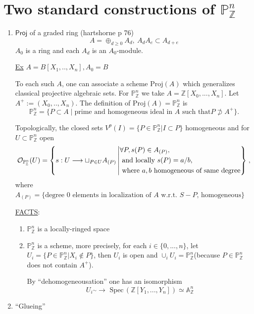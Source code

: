 \documentclass[11pt]{article}
\newcommand{\spec}{\text{ Spec}\,}
\newcommand{\affn}{\mathbb A}
\newcommand{\proj}{\mathbb P}
\newcommand{\intg}{\mathbb Z}
\newcommand{\calo}{{\cal O}}
\newcommand{\notsupset}{\not \supset}
\newcommand{\lrta}{\longrightarrow}
\begin{document}
\section*{Two standard constructions of $\proj^n_\intg$}
\begin{enumerate}[label=(\arabic*)]
\item $\mathsf{Proj}$ of a graded ring (hartshorne p 76)
$$
A=\oplus_{d\geq 0} A_d, ~A_d A_e\subset A_{d+e}
$$
$A_0$ is a ring and each $A_d$ is an $A_0$-module.

\underline{Ex} $A=B[X_1,..,X_n],A_0=B$

To each such $A$, one can associate a scheme $\text{Proj}(A)$ which generalizes classical projective algebraic sets. For $\proj^n_\intg$ we take $A=\intg[X_0,...,X_n]$. Let $A^+:=(X_0,..,X_n)$. The definition of $\text{Proj}(A)=\proj^n_\intg$ is 
$$
\proj^n_\intg=\{P\subset A\mid \text{prime and homogeneous ideal in $A$ such that} P\notsupset A^+\}.
$$

Topologically, the closed sets $V^p(I)=\{P\in\proj^n_\intg|I \subset P\}$ homogeneous and for $U\subset \proj^n_\intg$ open
$$
\calo_{\proj_\intg^n}(U)=\left\{
s:U\lrta \sqcup_{P\in U}A_{(P)}\left| \begin{aligned} &\forall P, s(P)\in A_{(P)},\\
&\text{ and  locally } s(P)=a/b,\\
& \text{ where } a,b \text{ homogeneous  of same degree}
\end{aligned}
\right\}
\right.,
$$
where $A_{(P)}=\{\text{degree $0$ elements in localization of $A$ w.r.t. $S-P$, homogeneous}\}$

\underline{FACTS}:
\begin{enumerate}
\item $\proj^n_\intg$ is  a locally-ringed space
\item $\proj^n_\intg$ is a scheme, more precisely, for each $i\in \{0,...,n\}$, let $U_i=\{P\in \proj^n_\intg|X_i\notin P\}$, then $U_i$ is open and $\cup_i U_i =\proj^n_\intg$(because $P\in \proj^n_\intg$ does not contain $A^+$).

By ``dehomogeneousation'' one has an isomorphism
$$
U_i\overset{\sim}{}\lrta 
\spec(\intg[Y_1,...,Y_n])\simeq \affn^n_\intg$$
\end{enumerate}
\item ``Glueing''

        

\begin{tikzpicture}[x=0.75pt,y=0.75pt,yscale=-1,xscale=1]


\end{tikzpicture}
\end{enumerate}
\end{document}
